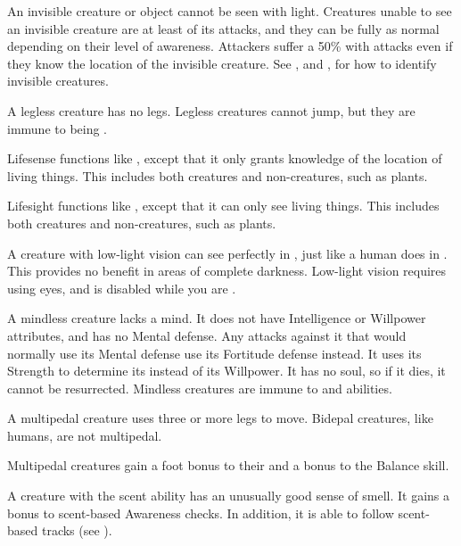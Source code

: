   An invisible creature or object cannot be seen with light.
  Creatures unable to see an invisible creature are at least \partiallyunaware of its attacks, and they can be fully \unaware as normal depending on their level of awareness.
  Attackers suffer a 50\%  with  attacks even if they know the location of the invisible creature.
  See , and , for how to identify invisible creatures.

  A legless creature has no legs.
  Legless creatures cannot jump, but they are immune to being \prone.

  Lifesense functions like , except that it only grants knowledge of the location of living things.
  This includes both creatures and non-creatures, such as plants.

  Lifesight functions like , except that it can only see living things.
  This includes both creatures and non-creatures, such as plants.

  A creature with low-light vision can see perfectly in , just like a human does in .
  This provides no benefit in areas of complete darkness.
  Low-light vision requires using eyes, and is disabled while you are \dazzled.

  A mindless creature lacks a mind.
  It does not have Intelligence or Willpower attributes, and has no Mental defense.
  Any attacks against it that would normally use its Mental defense use its Fortitude defense instead.
  It uses its Strength to determine its  instead of its Willpower.
  It has no soul, so if it dies, it cannot be resurrected.
  Mindless creatures are immune to  and  abilities.

  A multipedal creature uses three or more legs to move.
  Bidepal creatures, like humans, are not multipedal.

  Multipedal creatures gain a  foot bonus to their  and a  bonus to the Balance skill.

  A creature with the scent ability has an unusually good sense of smell.
  It gains a  bonus to scent-based Awareness checks.
  In addition, it is able to follow scent-based tracks (see ).

